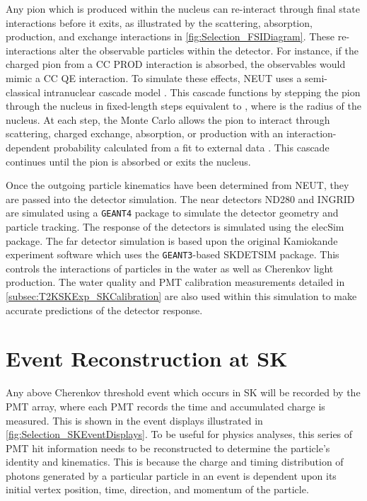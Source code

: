 Any pion which is produced within the nucleus can re-interact through final state interactions before it exits, as illustrated by the scattering, absorption, production, and exchange interactions in \autoref{fig:Selection_FSIDiagram}. These re-interactions alter the observable particles within the detector. For instance, if the charged pion from a CC PROD interaction is absorbed, the observables would mimic a CC QE interaction. To simulate these effects, NEUT uses a semi-classical intranuclear cascade model \cite{Hayato2021}. This cascade functions by stepping the pion through the nucleus in fixed-length steps equivalent to , where  is the radius of the nucleus. At each step, the Monte Carlo allows the pion to interact through scattering, charged exchange, absorption, or production with an interaction-dependent probability calculated from a fit to external data \cite{PhysRevD.99.052007}. This cascade continues until the pion is absorbed or exits the nucleus.

Once the outgoing particle kinematics have been determined from NEUT, they are passed into the detector simulation. The near detectors ND280 and INGRID are simulated using a \texttt{GEANT4} package \cite{t2k_det,geant4} to simulate the detector geometry and particle tracking. The response of the detectors is simulated using the elecSim package. The far detector simulation is based upon the original Kamiokande experiment software which uses the \texttt{GEANT3}-based SKDETSIM \cite{Brun:1987ma,t2k_det} package. This controls the interactions of particles in the water as well as Cherenkov light production. The water quality and PMT calibration measurements detailed in \autoref{subsec:T2KSKExp_SKCalibration} are also used within this simulation to make accurate predictions of the detector response.

\section{Event Reconstruction at SK}
\label{sec:Simulation_Reconstruction}

Any above Cherenkov threshold event which occurs in SK will be recorded by the PMT array, where each PMT records the time and accumulated charge is measured. This is shown in the event displays illustrated in \autoref{fig:Selection_SKEventDisplays}. To be useful for physics analyses, this series of PMT hit information needs to be reconstructed to determine the particle's identity and kinematics. This is because the charge and timing distribution of photons generated by a particular particle in an event is dependent upon its initial vertex position, time, direction, and momentum of the particle. 

